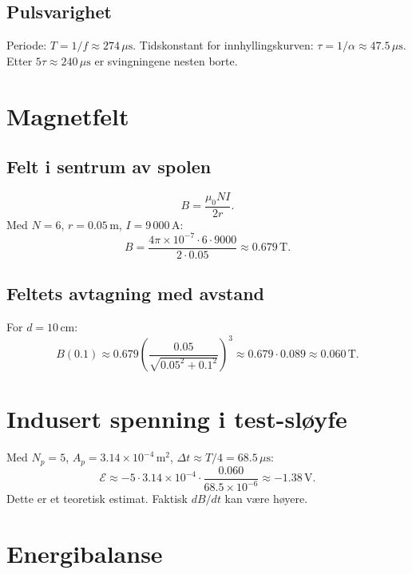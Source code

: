 \documentclass{article}
\begin{document}
\subsection{Pulsvarighet}
Periode: $T = 1/f \approx 274\,\mu\text{s}$. Tidskonstant for innhyllingskurven: $\tau = 1/\alpha \approx 47.5\,\mu\text{s}$. Etter $5\tau \approx 240\,\mu\text{s}$ er svingningene nesten borte.

\section{Magnetfelt}

\subsection{Felt i sentrum av spolen}
\begin{equation}
B = \frac{\mu_0 N I}{2 r}.
\end{equation}
Med $N=6$, $r=0.05\,\text{m}$, $I=9\,000\,\text{A}$:
\begin{equation}
B = \frac{4\pi \times 10^{-7} \cdot 6 \cdot 9000}{2 \cdot 0.05} \approx 0.679\,\text{T}.
\end{equation}

\subsection{Feltets avtagning med avstand}
For $d = 10\,\text{cm}$:
\begin{equation}
B(0.1) \approx 0.679 \left( \frac{0.05}{\sqrt{0.05^2 + 0.1^2}} \right)^3 \approx 0.679 \cdot 0.089 \approx 0.060\,\text{T}.
\end{equation}

\section{Indusert spenning i test-sløyfe}
Med $N_p=5$, $A_p=3.14\times10^{-4}\,\text{m}^2$, $\Delta t \approx T/4 = 68.5\,\mu\text{s}$:
\begin{equation}
\mathcal{E} \approx -5 \cdot 3.14\times10^{-4} \cdot \frac{0.060}{68.5\times10^{-6}} \approx -1.38\,\text{V}.
\end{equation}
Dette er et teoretisk estimat. Faktisk $dB/dt$ kan være høyere.

\section{Energibalanse}
\end{document}
